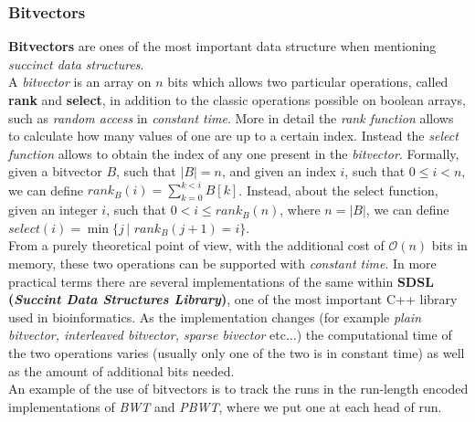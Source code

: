 \documentclass[a4paper,11pt, oneside]{article}
\begin{document}
\subsubsection*{Bitvectors}
\textbf{Bitvectors} are ones of the most important data structure when
mentioning \textit{succinct data structures}. \\
A \textit{bitvector} is an array on $n$ bits which allows two particular
operations, called \textbf{rank} and \textbf{select}, in addition to the classic
operations possible on boolean arrays, such as \textit{random access} in
\textit{constant time}. More in detail the \textit{rank
function} allows to calculate how many values of one are up to a certain
index. Instead the \textit{select function} allows to obtain the index of any
one present 
in the \textit{bitvector}. Formally, given a bitvector $B$, such that $|B|=n$,
and given 
an index $i$, such that $0\leq i<n$, we can define $rank_B(i)=\sum_{k=0}^{k<i}
B[k]$. Instead, about the select function, given an integer $i$, such that
$0<i\leq rank_B(n)$, where $n=|B|$, we can define $select(i)=\min\{j \,| \,\,
rank_B(j+1)=i\}$.\\
From a purely theoretical point of view, with the additional cost of
$\mathcal{O}(n)$ bits in memory, these two operations can be supported with
\textit{constant time}. In more practical terms there are several
implementations of the 
same within \textbf{SDSL (\textit{Succint Data Structures Library})}, one of the
most important C++ library used in bioinformatics. As 
the implementation changes (for example \textit{plain bitvector, interleaved
  bitvector, sparse bivector} etc$\ldots$) the computational time of the two
operations varies (usually only one of the two is in constant time) as well as
the amount of additional bits needed.\\
An example of the use of bitvectors is to track the runs in the run-length
encoded implementations of \textit{BWT} and \textit{PBWT}, where we put one at
each head of run.
\end{document}
